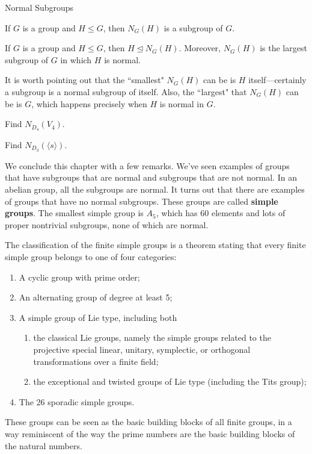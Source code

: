\begin{section}{Normal Subgroups}
\begin{theorem}
If $G$ is a group and $H\leq G$, then $N_G(H)$ is a subgroup of $G$.
\end{theorem}

\begin{theorem}
If $G$ is a group and $H\leq G$, then $H\trianglelefteq N_G(H)$.  Moreover, $N_G(H)$ is the largest subgroup of $G$ in which $H$ is normal. 
\end{theorem}

It is worth pointing out that the ``smallest" $N_G(H)$ can be is $H$ itself---certainly a subgroup is a normal subgroup of itself.  Also, the ``largest" that $N_G(H)$ can be is $G$, which happens precisely when $H$ is normal in $G$.

\begin{problem}
Find $N_{D_4}(V_4)$.
\end{problem}

\begin{problem}
Find $N_{D_3}(\langle s\rangle)$.
\end{problem}

We conclude this chapter with a few remarks.  We've seen examples of groups that have subgroups that are normal and subgroups that are not normal.  In an abelian group, all the subgroups are normal.  It turns out that there are examples of groups that have no normal subgroups.  These groups are called \textbf{simple groups}.  The smallest simple group is $A_5$, which has 60 elements and lots of proper nontrivial subgroups, none of which are normal.


The classification of the finite simple groups is a theorem stating that every finite simple group belongs to one of four categories:
\begin{enumerate}
\item A cyclic group with prime order;
\item An alternating group of degree at least 5;
\item A simple group of Lie type, including both 
\begin{enumerate}
\item the classical Lie groups, namely the simple groups related to the projective special linear, unitary, symplectic, or orthogonal transformations over a finite field;
\item the exceptional and twisted groups of Lie type (including the Tits group);
\end{enumerate}
\item The 26 sporadic simple groups.
\end{enumerate}
These groups can be seen as the basic building blocks of all finite groups, in a way reminiscent of the way the prime numbers are the basic building blocks of the natural numbers.


\end{section}
